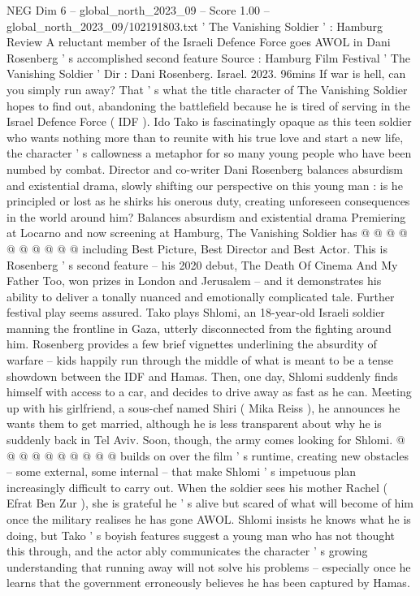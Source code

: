 \begin{textsample}{NEG Dim 6 – global\_north\_2023\_09 – Score 1.00 – global\_north\_2023\_09/102191803.txt}  \label{ex:f6_neg_337}
' The Vanishing Soldier ' : Hamburg Review A reluctant member of the Israeli Defence Force goes AWOL in Dani Rosenberg ' s accomplished second feature Source : Hamburg Film Festival ' The Vanishing Soldier ' Dir : Dani Rosenberg.
Israel. 2023. 96mins If war is hell, can you simply run away?
That ' s what the title character of The Vanishing Soldier hopes to find out, abandoning the battlefield because he is tired of serving in the Israel Defence Force ( IDF ).
Ido Tako is fascinatingly opaque as this teen soldier who wants nothing more than to reunite with his true love and start a new life, the character ' s callowness a metaphor for so many young people who have been numbed by combat.
Director and co-writer Dani Rosenberg balances absurdism and existential drama, slowly shifting our perspective on this young man : is he principled or lost as he shirks his onerous duty, creating unforeseen consequences in the world around him?
Balances absurdism and existential drama Premiering at Locarno and now screening at Hamburg, The Vanishing Soldier has @ @ @ @ @ @ @ @ @ @ including Best Picture, Best Director and Best Actor.
This is Rosenberg ' s second feature -- his 2020 debut, The Death Of Cinema And My Father Too, won prizes in London and Jerusalem -- and it demonstrates his ability to deliver a tonally nuanced and emotionally complicated tale.
Further festival play seems assured.
Tako plays Shlomi, an 18-year-old Israeli soldier manning the frontline in Gaza, utterly disconnected from the fighting around him.
Rosenberg provides a few brief vignettes underlining the absurdity of warfare -- kids happily run through the middle of what is meant to be a tense showdown between the IDF and Hamas.
Then, one day, Shlomi suddenly finds himself with access to a car, and decides to drive away as fast as he can.
Meeting up with his girlfriend, a sous-chef named Shiri ( Mika Reiss ), he announces he wants them to get married, although he is less transparent about why he is suddenly back in Tel Aviv.
Soon, though, the army comes looking for Shlomi. @ @ @ @ @ @ @ @ @ @ builds on over the film ' s runtime, creating new obstacles -- some external, some internal -- that make Shlomi ' s impetuous plan increasingly difficult to carry out.
When the soldier sees his mother Rachel ( Efrat Ben Zur ), she is grateful he ' s alive but scared of what will become of him once the military realises he has gone AWOL.
Shlomi insists he knows what he is doing, but Tako ' s boyish features suggest a young man who has not thought this through, and the actor ably communicates the character ' s growing understanding that running away will not solve his problems -- especially once he learns that the government erroneously believes he has been captured by Hamas.

\end{textsample}
